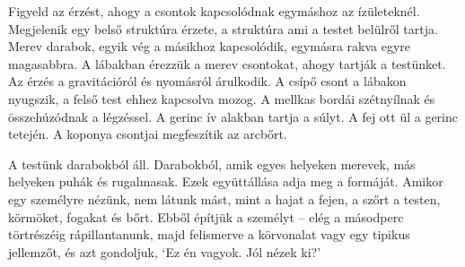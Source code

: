 Figyeld az érzést, ahogy a csontok kapcsolódnak egymáshoz az
ízületeknél. Megjelenik egy belső struktúra érzete, a struktúra ami a
testet belülről tartja. Merev darabok, egyik vég a másikhoz kapcsolódik,
egymásra rakva egyre magasabbra. A lábakban érezzük a merev csontokat,
ahogy tartják a testünket. Az érzés a gravitációról és nyomásról
árulkodik. A csípő csont a lábakon nyugszik, a felső test ehhez
kapcsolva mozog. A mellkas bordái szétnyílnak és összehúzódnak a
légzéssel. A gerinc ív alakban tartja a súlyt. A fej ott ül a gerinc
tetején. A koponya csontjai megfeszítik az arcbőrt.

A testünk darabokból áll. Darabokból, amik egyes helyeken merevek, más
helyeken puhák és rugalmasak. Ezek együttállása adja meg a formáját.
Amikor egy személyre nézünk, nem látunk mást, mint a hajat a fejen, a
szőrt a testen, körmöket, fogakat és bőrt. Ebből építjük a személyt --
elég a másodperc törtrészéig rápillantanunk, majd felismerve a
körvonalat vagy egy tipikus jellemzőt, és azt gondoljuk, `Ez én vagyok.
Jól nézek ki?'

\clearpage
\figurepagelayout

